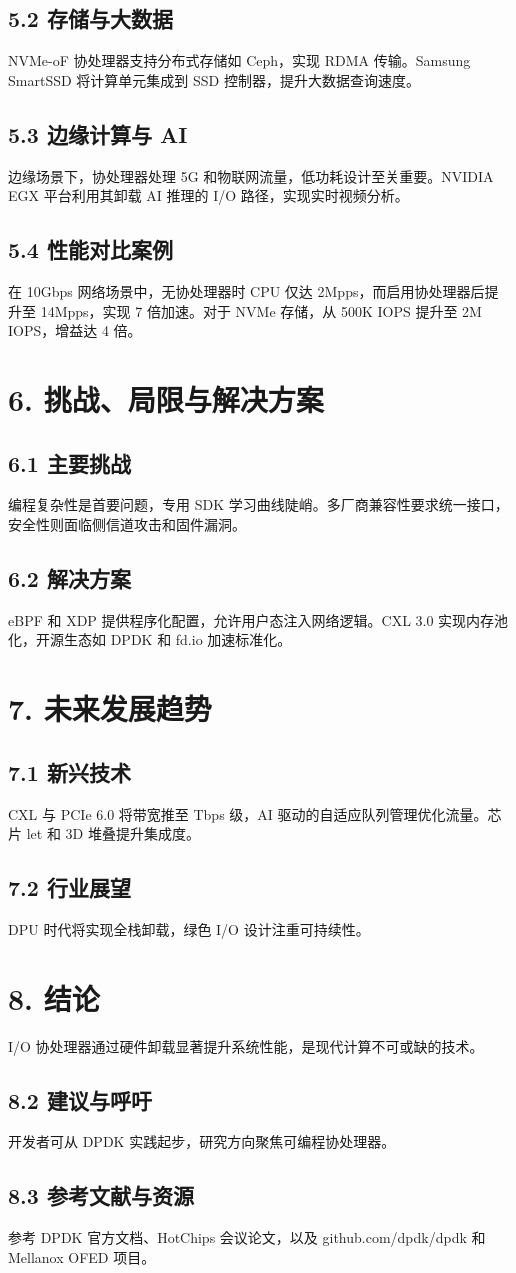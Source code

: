 \section{5.2 存储与大数据}
NVMe-oF 协处理器支持分布式存储如 Ceph，实现 RDMA 传输。Samsung SmartSSD 将计算单元集成到 SSD 控制器，提升大数据查询速度。\par
\section{5.3 边缘计算与 AI}
边缘场景下，协处理器处理 5G 和物联网流量，低功耗设计至关重要。NVIDIA EGX 平台利用其卸载 AI 推理的 I/O 路径，实现实时视频分析。\par
\section{5.4 性能对比案例}
在 10Gbps 网络场景中，无协处理器时 CPU 仅达 2Mpps，而启用协处理器后提升至 14Mpps，实现 7 倍加速。对于 NVMe 存储，从 500K IOPS 提升至 2M IOPS，增益达 4 倍。\par
\chapter{6. 挑战、局限与解决方案}
\section{6.1 主要挑战}
编程复杂性是首要问题，专用 SDK 学习曲线陡峭。多厂商兼容性要求统一接口，安全性则面临侧信道攻击和固件漏洞。\par
\section{6.2 解决方案}
eBPF 和 XDP 提供程序化配置，允许用户态注入网络逻辑。CXL 3.0 实现内存池化，开源生态如 DPDK 和 fd.io 加速标准化。\par
\chapter{7. 未来发展趋势}
\section{7.1 新兴技术}
CXL 与 PCIe 6.0 将带宽推至 Tbps 级，AI 驱动的自适应队列管理优化流量。芯片 let 和 3D 堆叠提升集成度。\par
\section{7.2 行业展望}
DPU 时代将实现全栈卸载，绿色 I/O 设计注重可持续性。\par
\chapter{8. 结论}
I/O 协处理器通过硬件卸载显著提升系统性能，是现代计算不可或缺的技术。\par
\section{8.2 建议与呼吁}
开发者可从 DPDK 实践起步，研究方向聚焦可编程协处理器。\par
\section{8.3 参考文献与资源}
参考 DPDK 官方文档、HotChips 会议论文，以及 github.com/dpdk/dpdk 和 Mellanox OFED 项目。\par
